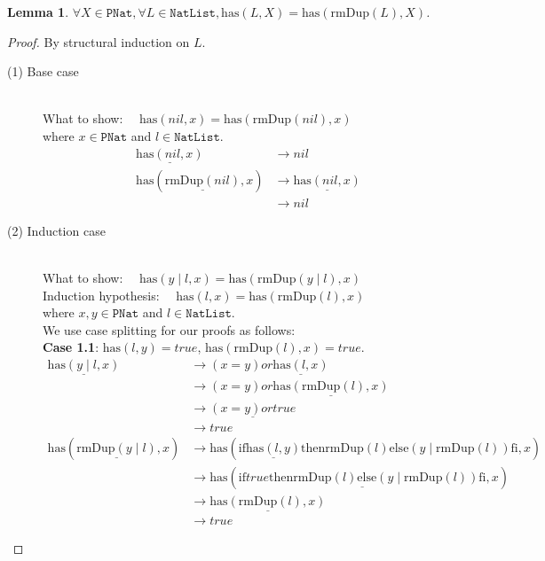 \documentclass[12pt, a4paper]{article}
\newtheorem{lemma}[theorem]{Lemma}
\newcommand{\rel}[1]{\mathrel{#1}}
\newcommand{\rmx}[1]{\mathrm{#1}}
\newcommand{\larrow}{\longrightarrow}
\newcommand{\under}{\underline}
\begin{document}
\begin{lemma}
\label{lm1}
$\forall X \in \mathtt{PNat}, \forall L \in \mathtt{NatList}, \rmx{has}(L, X) = \rmx{has}(\rmx{rmDup}(L), X)$.
\end{lemma}
\begin{proof}
By structural induction on $L$.
\begin{description}
\item[(1) Base case]~\\
\noindent
What to show: $\quad \rmx{has}(nil, x) = \rmx{has}(\rmx{rmDup}(nil), x)$ \\
where $x \in \mathtt{PNat}$ and $l \in \mathtt{NatList}$.
\begin{align*}
\under{\rmx{has}(nil, x)}
	&\larrow nil \tag{by has1} \\
\rmx{has}(\under{\rmx{rmDup}(nil)}, x)
	&\larrow \under{\rmx{has}(nil, x)} \tag{by rmDup1} \\
	&\larrow nil \tag{by has1}
\end{align*}

\item[(2) Induction case]~\\
What to show: $\quad \rmx{has}(y \mid l, x) = \rmx{has}(\rmx{rmDup}(y \mid l), x)$ \\
Induction hypothesis: $\quad \rmx{has}(l, x) = \rmx{has}(\rmx{rmDup}(l), x)$  \\
where $x, y \in \mathtt{PNat}$ and $l \in \mathtt{NatList}$.\\
We use case splitting for our proofs as follows: \\
\textbf{Case 1.1}: $\rmx{has}(l, y) = true$, $\rmx{has}(\rmx{rmDup}(l), x) = true$.
\begin{align*}
\under{\rmx{has}(y \mid l, x)}
	&\larrow (x = y) \rel{or} \under{\rmx{has}(l, x)} \tag{by has2} \\
	&\larrow (x = y) \rel{or} \under{\rmx{has}(\rmx{rmDup}(l), x)} \tag{by IH} \\
	&\larrow \under{(x = y) \rel{or} true} \tag{by case splitting} \\
	&\larrow true \tag{by or} \\
\rmx{has}(\under{\rmx{rmDup}(y \mid l)}, x)
	&\larrow \rmx{has}(\rel{\rmx{if}} \under{\rmx{has}(l, y)} \rel{\rmx{then}} \rmx{rmDup}(l) \rel{\rmx{else}} (y \mid \rmx{rmDup}(l)) \rel{\rmx{fi}}, x) \tag{by rmDup2} \\
	&\larrow \rmx{has}(\under{\rel{\rmx{if}} true \rel{\rmx{then}} \rmx{rmDup}(l) \rel{\rmx{else}} (y \mid \rmx{rmDup}(l)) \rel{\rmx{fi}}}, x) \tag{by case splitting} \\
	&\larrow \under{\rmx{has}(\rmx{rmDup}(l), x)} \tag{by if1} \\
	&\larrow true \tag{by case splitting}
\end{align*}


\end{description}
\end{proof}
\end{document}
